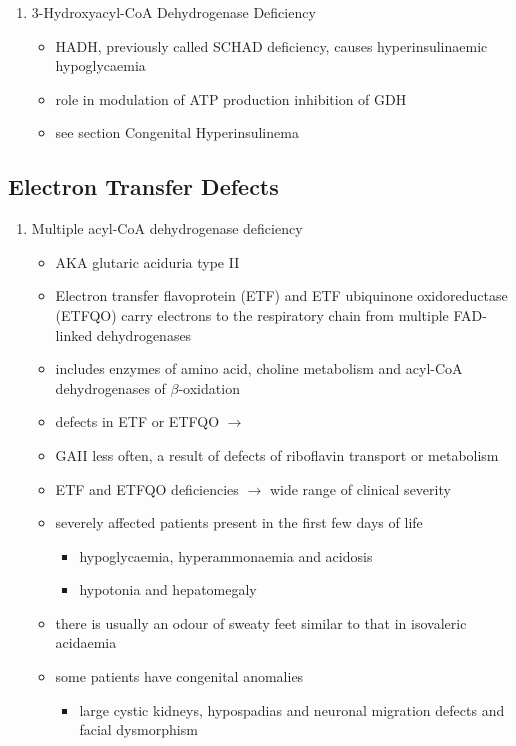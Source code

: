 \documentclass{scrartcl}
\begin{document}
\begin{enumerate}
\item 3-Hydroxyacyl-CoA Dehydrogenase Deficiency
\label{sec:orgd84f973}
\begin{itemize}
\item HADH, previously called SCHAD deficiency, causes hyperinsulinaemic
hypoglycaemia
\item role in modulation of ATP production inhibition of GDH
\item see section Congenital Hyperinsulinema
\end{itemize}
\end{enumerate}
\subsection{Electron Transfer Defects}
\label{sec:orgefd2819}
\begin{enumerate}
\item Multiple acyl-CoA dehydrogenase deficiency
\label{sec:org04528b1}
\begin{itemize}
\item AKA glutaric aciduria type II
\item Electron transfer flavoprotein (ETF) and ETF ubiquinone
oxidoreductase (ETFQO) carry electrons to the respiratory chain from
multiple FAD-linked dehydrogenases
\item includes enzymes of amino acid, choline metabolism and acyl-CoA
dehydrogenases of \(\beta\)-oxidation
\item defects in ETF or ETFQO \(\to\)
\item GAII less often, a result of defects of riboflavin transport or
metabolism
\item ETF and ETFQO deficiencies \(\to\) wide range of clinical severity
\item severely affected patients present in the first few days of life
\begin{itemize}
\item hypoglycaemia, hyperammonaemia and acidosis
\item hypotonia and hepatomegaly
\end{itemize}
\item there is usually an odour of sweaty feet similar to that in isovaleric acidaemia
\item some patients have congenital anomalies
\begin{itemize}
\item large cystic kidneys, hypospadias and neuronal migration defects and facial dysmorphism
\begin{itemize}

\end{itemize}
\end{itemize}
\end{itemize}
\end{enumerate}
\end{document}
